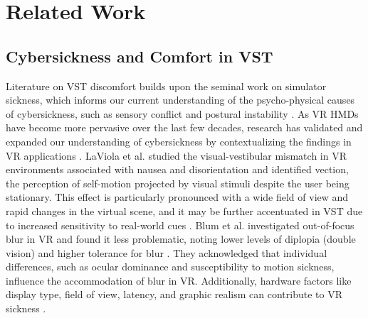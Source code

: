 \section{Related Work}
\subsection{Cybersickness and Comfort in VST}
Literature on VST discomfort builds upon the seminal work on simulator sickness, which informs our current understanding of the psycho-physical causes of cybersickness, such as sensory conflict and postural instability \cite{reason1975motion}. As VR HMDs have become more pervasive over the last few decades, research has validated and expanded our understanding of cybersickness by contextualizing the findings in VR applications \cite{li2022mixed}. LaViola et al.  \cite{laviola2000discussion} studied the visual-vestibular mismatch in VR environments associated with nausea and disorientation and identified vection, the perception of self-motion projected by visual stimuli despite the user being stationary. This effect is particularly pronounced with a wide field of view and rapid changes in the virtual scene, and it may be further accentuated in VST due to increased sensitivity to real-world cues \cite{suwa2022reducing}. Blum et al. investigated out-of-focus blur in VR and found it less problematic, noting lower levels of diplopia (double vision) and higher tolerance for blur \cite{blum2010effect}. They acknowledged that individual differences, such as ocular dominance and susceptibility to motion sickness, influence the accommodation of blur in VR. Additionally, hardware factors like display type, field of view, latency, and graphic realism can contribute to VR sickness \cite{chang2020virtual}. 

